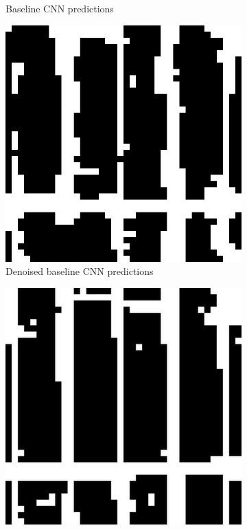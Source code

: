 \documentclass[10pt,conference,compsocconf]{IEEEtran}
\begin{document}
\begin{figure}
\begin{subfigure}[t]{.19\textwidth}
		\caption{Baseline CNN predictions}
		\label{fig:results_1}
	\end{subfigure}	
	\begin{subfigure}[t]{.19\textwidth}
		\includegraphics[width=1\textwidth]{figs/results_comparison/post_pro_baseline_8}
		\caption{Denoised baseline CNN predictions}
		\label{fig:results_2}
	\end{subfigure}	
	\begin{subfigure}[t]{.19\textwidth}
		\includegraphics[width=1\textwidth]{figs/results_comparison/cnn_final_8}

\end{subfigure}
\end{figure}
\end{document}
